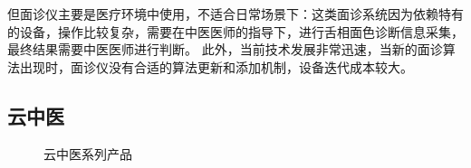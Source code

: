 但面诊仪主要是医疗环境中使用，不适合日常场景下：这类面诊系统因为依赖特有的设备，操作比较复杂，需要在中医医师的指导下，进行舌相面色诊断信息采集，最终结果需要中医医师进行判断。
此外，当前技术发展非常迅速，当新的面诊算法出现时，面诊仪没有合适的算法更新和添加机制，设备迭代成本较大。

\subsection{云中医}

\begin{figure}
    \centering
    \caption{云中医系列产品}
    \label{fig:cloudmed}
\end{figure}

